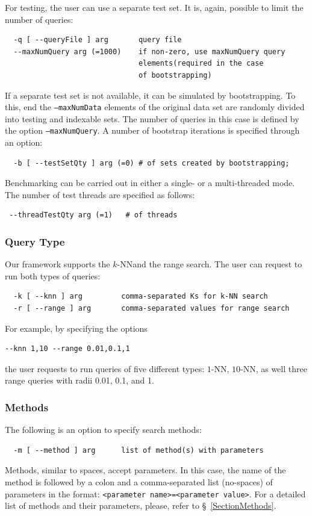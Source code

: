 \documentclass[runningheads,a4paper]{llncs}
\newcommand{\ttt}[1]{\texttt{#1}}
\newcommand{\knn}{$k$-NN}
\begin{document}
{For testing, the user can use a separate test set.
It is, again, possible to limit the number of queries:
\begin{verbatim}
  -q [ --queryFile ] arg       query file
  --maxNumQuery arg (=1000)    if non-zero, use maxNumQuery query 
                               elements(required in the case 
                               of bootstrapping)
\end{verbatim}
If a separate test set is not available, it can be simulated by bootstrapping.
To this, end the \ttt{--maxNumData} elements of the original data set
are randomly divided into testing and indexable sets.
The number of queries in this case is defined by the option \ttt{--maxNumQuery}.
A number of bootstrap iterations is specified through an option:
\begin{verbatim}
  -b [ --testSetQty ] arg (=0) # of sets created by bootstrapping; 
\end{verbatim}
Benchmarking can be carried out in either a single- or a multi-threaded
mode. The number of test threads are specified as follows:
\begin{verbatim}
 --threadTestQty arg (=1)   # of threads
\end{verbatim}

\subsubsection{Query Type} 
Our framework supports the \knn and the range search.
The user can request to run both types of queries:
\begin{verbatim}
  -k [ --knn ] arg         comma-separated Ks for k-NN search
  -r [ --range ] arg       comma-separated values for range search
\end{verbatim}
For example, by specifying the options 
\begin{verbatim}
--knn 1,10 --range 0.01,0.1,1
\end{verbatim}
the user requests to run queries of five different types: $1$-NN, $10$-NN,
as well three range queries with radii 0.01, 0.1, and 1.

\subsubsection{Methods}
The following is an option to specify search methods:
\begin{verbatim}
  -m [ --method ] arg      list of method(s) with parameters
\end{verbatim}
Methods, similar to spaces, accept parameters. 
In this case,
the name of the method is followed by a colon and a comma-separated list (no-spaces)
of parameters in the format:
\ttt{<parameter name>=<parameter value>}.
For a detailed list of methods and their parameters, please, refer to \S~\ref{SectionMethods}.

}
\end{document}
